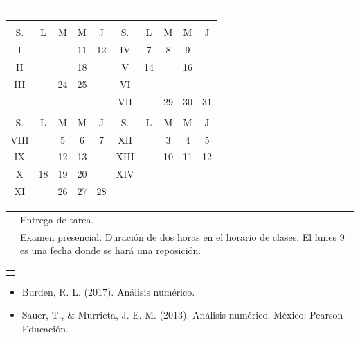 \documentclass[12pt,letterpaper]{article}
\begin{document}
\begin{multicols}{2}
\begin{center}
\begin{tabular}{c}
\cellcolor{gray!40}{PROGRAMACIÓN}
\end{tabular}
\end{center}
\begin{center}
\begin{tabular}{ccccc|ccccc}
\multicolumn{5}{c|}{\cellcolor{red!40}{SEPTIEMBRE}}&\multicolumn{5}{c}{\cellcolor{blue!40}{OCTUBRE}}\\
S.&L&M&M&J&S.&L&M&M&J\\
I&\cellcolor{gray!40}{}&\cellcolor{gray!40}{}&11&12&IV&7&8&9&\cellcolor{TAREA}{10}\\
II&\cellcolor{gray!40}{}&\cellcolor{gray!40}{}&18&\cellcolor{white}{19}&V&14&\cellcolor{gray!40}{}&16&\cellcolor{EXAMEN}{17}\\
III&\cellcolor{white}{23}&24&25&\cellcolor{gray!40}{}&VI&\cellcolor{white}{21}&\cellcolor{white}{22}&\cellcolor{white}{23}&\cellcolor{white}{24}\\
&&&&&VII&\cellcolor{white}{28}&29&30&31\\
\multicolumn{5}{c|}{\cellcolor{cyan!40}{NOVIEMBRE}}&\multicolumn{5}{c}{\cellcolor{green!40}{DICIEMBRE}}\\
S.&L&M&M&J&S.&L&M&M&J\\
VIII&\cellcolor{TAREA}{4}&5&6&7&XII&\cellcolor{EXAMEN}{2}&3&4&5\\
IX&\cellcolor{EXAMEN}{11}&12&13&\cellcolor{white}{14}&XIII&\cellcolor{EXAMEN}{9}&10&11&12\\
X&18&19&20&\cellcolor{white}{21}&XIV&\cellcolor{gray!40}{16}&\cellcolor{gray!40}{17}&\cellcolor{gray!40}{18}&\\
XI&\cellcolor{TAREA}{25}&26&27&28&&&&&\\
\end{tabular} 
\end{center}
\begin{center}
\begin{tabular}{lp{}}
\cellcolor{TAREA}{\ }&Entrega de tarea.\\
\cellcolor{EXAMEN}{\ }&Examen presencial. Duración de dos horas en el horario de clases. El lunes 9 es una fecha donde se hará una reposición.
\end{tabular}
\end{center}
\begin{center}
\begin{tabular}{c}
\cellcolor{gray!40}{BIBLIOGRAFÍAS}
\end{tabular}
\end{center}
\begin{itemize}
\item Burden, R. L. (2017). Análisis numérico.
\item Sauer, T., \& Murrieta, J. E. M. (2013). Análisis numérico. México: Pearson Educación.
\end{itemize}
\end{multicols}
\begin{center}
\end{center}
\end{document}
